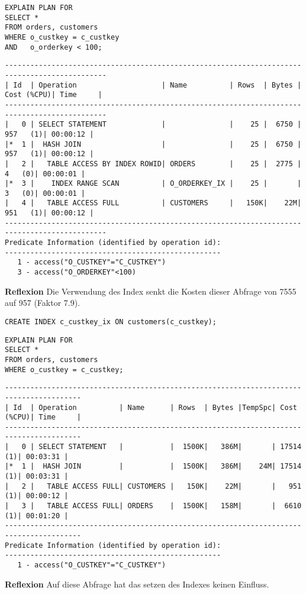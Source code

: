\documentclass[10pt]{article}
\begin{document}
\begin{lstlisting}[style=sql]
EXPLAIN PLAN FOR
SELECT *
FROM orders, customers
WHERE o_custkey = c_custkey
AND   o_orderkey < 100;
\end{lstlisting}
\begin{lstlisting}[style=queryexecutionplan]
----------------------------------------------------------------------------------------------
| Id  | Operation                    | Name          | Rows  | Bytes | Cost (%CPU)| Time     |
----------------------------------------------------------------------------------------------
|   0 | SELECT STATEMENT             |               |    25 |  6750 |   957   (1)| 00:00:12 |
|*  1 |  HASH JOIN                   |               |    25 |  6750 |   957   (1)| 00:00:12 |
|   2 |   TABLE ACCESS BY INDEX ROWID| ORDERS        |    25 |  2775 |     4   (0)| 00:00:01 |
|*  3 |    INDEX RANGE SCAN          | O_ORDERKEY_IX |    25 |       |     3   (0)| 00:00:01 |
|   4 |   TABLE ACCESS FULL          | CUSTOMERS     |   150K|    22M|   951   (1)| 00:00:12 |
----------------------------------------------------------------------------------------------
Predicate Information (identified by operation id):
---------------------------------------------------
   1 - access("O_CUSTKEY"="C_CUSTKEY")
   3 - access("O_ORDERKEY"<100)
\end{lstlisting}
\textbf{Reflexion} \newline
Die Verwendung des Index senkt die Kosten dieser Abfrage von 7555 auf 957 (Faktor 7.9).
\newpage
\begin{lstlisting}[style=sql]
CREATE INDEX c_custkey_ix ON customers(c_custkey);
\end{lstlisting}
\begin{lstlisting}[style=sql]
EXPLAIN PLAN FOR
SELECT *
FROM orders, customers
WHERE o_custkey = c_custkey;
\end{lstlisting}
\begin{lstlisting}[style=queryexecutionplan]
----------------------------------------------------------------------------------------
| Id  | Operation          | Name      | Rows  | Bytes |TempSpc| Cost (%CPU)| Time     |
----------------------------------------------------------------------------------------
|   0 | SELECT STATEMENT   |           |  1500K|   386M|       | 17514   (1)| 00:03:31 |
|*  1 |  HASH JOIN         |           |  1500K|   386M|    24M| 17514   (1)| 00:03:31 |
|   2 |   TABLE ACCESS FULL| CUSTOMERS |   150K|    22M|       |   951   (1)| 00:00:12 |
|   3 |   TABLE ACCESS FULL| ORDERS    |  1500K|   158M|       |  6610   (1)| 00:01:20 |
----------------------------------------------------------------------------------------
Predicate Information (identified by operation id):
---------------------------------------------------
   1 - access("O_CUSTKEY"="C_CUSTKEY")
\end{lstlisting}
\textbf{Reflexion} \newline
Auf diese Abfrage hat das setzen des Indexes keinen Einfluss.
\end{document}
